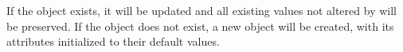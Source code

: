 If the object exists, it will be updated and all existing values not altered by
 will be preserved.  If the object does not exist, a new object will
be created, with its attributes initialized to their default values.

